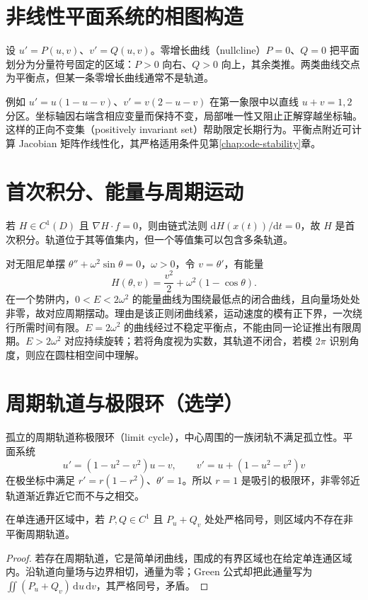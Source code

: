 \documentclass[UTF8,12pt,a4paper,fontset=fandol]{ctexbook}
\begin{document}
\section{非线性平面系统的相图构造}
设 $u'=P(u,v)$、$v'=Q(u,v)$。零增长曲线（nullcline）$P=0$、$Q=0$ 把平面划分为分量符号固定的区域：$P>0$ 向右、$Q>0$ 向上，其余类推。两类曲线交点为平衡点，但某一条零增长曲线通常不是轨道。

例如 $u'=u(1-u-v)$、$v'=v(2-u-v)$ 在第一象限中以直线 $u+v=1,2$ 分区。坐标轴因右端含相应变量而保持不变，局部唯一性又阻止正解穿越坐标轴。这样的正向不变集（positively invariant set）帮助限定长期行为。平衡点附近可计算 Jacobian 矩阵作线性化，其严格适用条件见第\ref{chap:ode-stability}章。

\section{首次积分、能量与周期运动}
若 $H\in C^1(D)$ 且 $\nabla H\cdot f=0$，则由链式法则 $\mathrm dH(x(t))/\mathrm dt=0$，故 $H$ 是首次积分。轨道位于其等值集内，但一个等值集可以包含多条轨道。

对无阻尼单摆 $\theta''+\omega^2\sin\theta=0$，$\omega>0$，令 $v=\theta'$，有能量
\[
 H(\theta,v)=\frac{v^2}{2}+\omega^2(1-\cos\theta).
\]
在一个势阱内，$0<E<2\omega^2$ 的能量曲线为围绕最低点的闭合曲线，且向量场处处非零，故对应周期摆动。理由是该正则闭曲线紧，运动速度的模有正下界，一次绕行所需时间有限。$E=2\omega^2$ 的曲线经过不稳定平衡点，不能由同一论证推出有限周期。$E>2\omega^2$ 对应持续旋转；若将角度视为实数，其轨道不闭合，若模 $2\pi$ 识别角度，则应在圆柱相空间中理解。

\section{周期轨道与极限环（选学）}
孤立的周期轨道称极限环（limit cycle），中心周围的一族闭轨不满足孤立性。平面系统
\[
 u'=(1-u^2-v^2)u-v,\qquad v'=u+(1-u^2-v^2)v
\]
在极坐标中满足 $r'=r(1-r^2)$、$\theta'=1$。所以 $r=1$ 是吸引的极限环，非零邻近轨道渐近靠近它而不与之相交。

\begin{proposition}[Bendixson 判据]
在单连通开区域中，若 $P,Q\in C^1$ 且 $P_u+Q_v$ 处处严格同号，则区域内不存在非平衡周期轨道。
\end{proposition}
\begin{proof}
若存在周期轨道，它是简单闭曲线，围成的有界区域也在给定单连通区域内。沿轨道向量场与边界相切，通量为零；Green 公式却把此通量写为 $\iint(P_u+Q_v)\,\mathrm du\,\mathrm dv$，其严格同号，矛盾。
\end{proof}
\end{document}
